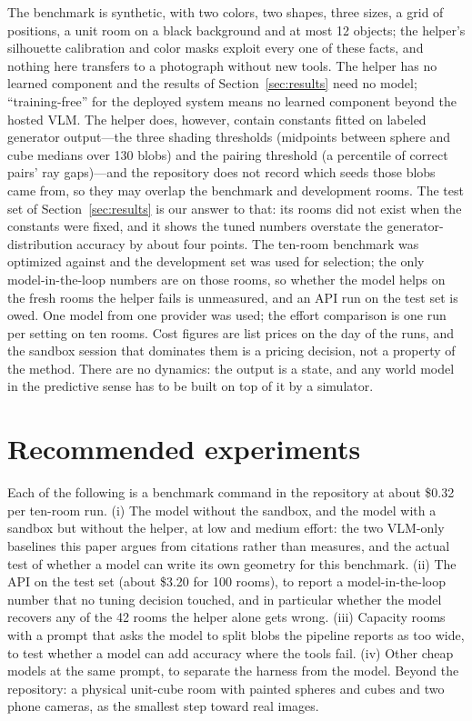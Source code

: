 \documentclass[10pt,a4paper]{article}
\begin{document}
The benchmark is synthetic, with two colors, two shapes, three sizes, a grid of positions, a unit room on a black background and at most 12 objects; the helper's silhouette calibration and color masks exploit every one of these facts, and nothing here transfers to a photograph without new tools. The helper has no learned component and the results of Section~\ref{sec:results} need no model; ``training-free'' for the deployed system means no learned component beyond the hosted VLM. The helper does, however, contain constants fitted on labeled generator output---the three shading thresholds (midpoints between sphere and cube medians over 130 blobs) and the pairing threshold (a percentile of correct pairs' ray gaps)---and the repository does not record which seeds those blobs came from, so they may overlap the benchmark and development rooms. The test set of Section~\ref{sec:results} is our answer to that: its rooms did not exist when the constants were fixed, and it shows the tuned numbers overstate the generator-distribution accuracy by about four points. The ten-room benchmark was optimized against and the development set was used for selection; the only model-in-the-loop numbers are on those rooms, so whether the model helps on the fresh rooms the helper fails is unmeasured, and an API run on the test set is owed. One model from one provider was used; the effort comparison is one run per setting on ten rooms. Cost figures are list prices on the day of the runs, and the sandbox session that dominates them is a pricing decision, not a property of the method. There are no dynamics: the output is a state, and any world model in the predictive sense has to be built on top of it by a simulator.

\section{Recommended experiments}
\label{sec:recommended}

Each of the following is a benchmark command in the repository at about \$0.32 per ten-room run. (i) The model without the sandbox, and the model with a sandbox but without the helper, at low and medium effort: the two VLM-only baselines this paper argues from citations rather than measures, and the actual test of whether a model can write its own geometry for this benchmark. (ii) The API on the test set (about \$3.20 for 100 rooms), to report a model-in-the-loop number that no tuning decision touched, and in particular whether the model recovers any of the 42 rooms the helper alone gets wrong. (iii) Capacity rooms with a prompt that asks the model to split blobs the pipeline reports as too wide, to test whether a model can add accuracy where the tools fail. (iv) Other cheap models at the same prompt, to separate the harness from the model. Beyond the repository: a physical unit-cube room with painted spheres and cubes and two phone cameras, as the smallest step toward real images.
\end{document}
